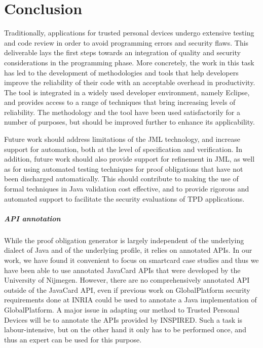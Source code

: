 

\chapter{Conclusion} 

Traditionally, applications for trusted personal devices undergo
extensive testing and code review in order to avoid programming errors
and security flaws. This deliverable lays the first steps towards an
integration of quality and security considerations in the programming
phase. More concretely, the work in this task has led to the
development of methodologies and tools that help developers improve
the reliability of their code with an acceptable overhead in
productivity. The tool is integrated in a widely used developer
environment, namely Eclipse, and provides access to a range of
techniques that bring increasing levels of reliability.  The
methodology and the tool have been used satisfactorily for a number of
purposes, but should be improved further to enhance its applicability.


Future work should address limitations of the JML technology, and
increase support for automation, both at the level of specification
and verification. In addition, future work should also provide support
for refinement in JML, as well as for using automated testing
techniques for proof obligations that have not been discharged
automatically. This should contribute to making the use of formal
techniques in Java validation cost effective, and to provide rigorous
and automated support to facilitate the security evaluations of TPD
applications.


\paragraph{API annotation}
While the proof obligation generator is largely independent of the
underlying dialect of Java and of the underlying profile, it relies on
annotated APIs. In our work, we have found it convenient to focus on
smartcard case studies and thus we have been able to use annotated
JavaCard APIs that were developed by the University of Nijmegen.
However, there are no comprehensively annotated API outside of the
Java\-Card API, even if previous work on GlobalPlatform security
requirements done at INRIA could be used to annotate a Java
implementation of GlobalPlatform. A major issue in adapting our method
to Trusted Personal Devices will be to annotate the APIs provided by
INSPIRED. Such a task is labour-intensive, but on the other hand it
only has to be performed once, and thus an expert can be used for this
purpose.

